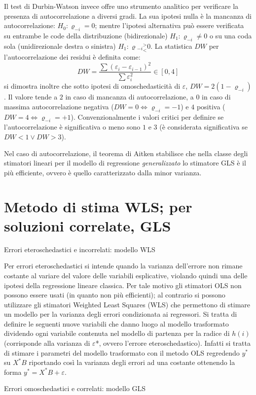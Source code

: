 \documentclass[a4page, 11pt]{article} %
\begin{document}
Il test di Durbin-Watson invece offre uno strumento analitico per verificare la presenza di autocorrelazione a diversi gradi.
La sua ipotesi nulla è la mancanza di autocorrelazione: $H_0: \varrho_{-i} = 0$; mentre l'ipotesi alternativa può essere verificata su entrambe le code della distribuzione (bidirezionale) $H_1: \varrho_{-i} \neq 0$ o su una coda sola (unidirezionale destra o sinistra) $H_1: \varrho{_{-i}} ^>_< 0$.
La statistica $DW$ per l'autocorrelazione dei residui è definita come:
\begin{equation*}
  DW = \frac{\sum{(\varepsilon_i - \varepsilon_{i-1})^2}}{\sum{ \varepsilon_i^2}} \in [0, 4]
\end{equation*}
si dimostra inoltre che sotto ipotesi di omoschedasticità di $\varepsilon$, $DW = 2(1 - \varrho_{-i})$.
Il valore tende a $2$ in caso di mancanza di autocorrelazione, a $0$ in caso di massima autocorrelazione negativa ($DW = 0 \Leftrightarrow \varrho_{-i} = -1$) e $4$ positiva ($DW = 4 \Leftrightarrow \varrho_{-i} = +1$).
Convenzionalmente i valori critici per definire se l'autocorrelazione è significativa o meno sono $1$ e $3$ (è considerata significativa se $DW < 1 \lor DW > 3$).

Nel caso di autocorrelazione, il teorema di Aitken stabilisce che nella classe degli stimatori lineari per il modello di regressione \textit{generalizzato} lo stimatore GLS è il più efficiente, ovvero è quello caratterizzato dalla minor varianza.


\section{Metodo di stima WLS; per soluzioni correlate, GLS }

\begin{itshape}
Errori eteroschedastici e incorrelati: modello WLS
\end{itshape}%

Per errori eteroschedastici si intende quando la varianza dell’errore non rimane costante al variare del valore delle variabili esplicative, violando quindi una delle ipotesi della regressione lineare classica. Per tale motivo gli stimatori OLS non possono essere usati (in quanto non più efficienti); al contrario si possono utilizzare gli stimatori Weighted Least Squares (WLS) che permettono di stimare un modello per la varianza degli errori condizionata ai regressori. 
Si tratta di definire le seguenti nuove variabili che danno luogo al modello trasformato dividendo ogni variabile contenuta nel modello di partenza per la radice di $h(i)$ (corrisponde alla varianza di $\varepsilon$*, ovvero l'errore eteroschedastico). 
Infatti si tratta di stimare i parametri del modello trasformato con il metodo OLS regredendo $y^*$ su $X^*B$ riportando così la varianza degli errori ad una costante ottenendo la forma $y^* = X^*B + \varepsilon$.
\newline
\begin{itshape}
Errori omoschedastici e correlati: modello GLS
\end{itshape}
\end{document}
